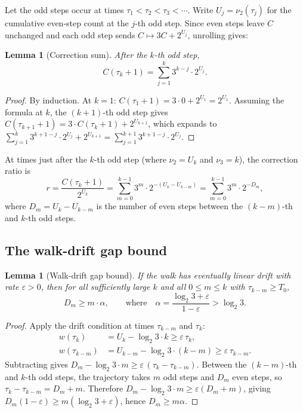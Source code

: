 \documentclass[manuscript]{aomart}
\theoremstyle{plain}
\newtheorem{lemma}[theorem]{Lemma}
\theoremstyle{definition}
\theoremstyle{remark}
\numberwithin{equation}{section}
\begin{document}
Let the odd steps occur at times $\tau_1 < \tau_2 < \tau_3 < \cdots$.
Write $U_j = \nu_2(\tau_j)$ for the cumulative even-step count at the
$j$-th odd step.  Since even steps leave $C$ unchanged and each odd
step sends $C \mapsto 3C + 2^{U_j}$, unrolling gives:

\begin{lemma}[Correction sum]\label{lem:C-sum}
After the $k$-th odd step,
\begin{equation}\label{eq:C-sum}
  C(\tau_k + 1) = \sum_{j=1}^{k} 3^{k-j} \cdot 2^{U_j}.
\end{equation}
\end{lemma}

\begin{proof}
By induction.  At $k = 1$: $C(\tau_1 + 1) = 3 \cdot 0 + 2^{U_1} =
2^{U_1}$.  Assuming the formula at $k$, the $(k{+}1)$-th odd step
gives $C(\tau_{k+1} + 1) = 3 \cdot C(\tau_k + 1) + 2^{U_{k+1}}$,
which expands to
$\sum_{j=1}^{k} 3^{k+1-j} \cdot 2^{U_j} + 2^{U_{k+1}}
= \sum_{j=1}^{k+1} 3^{k+1-j} \cdot 2^{U_j}$.
\end{proof}

At times just after the $k$-th odd step (where $\nu_2 = U_k$ and
$\nu_3 = k$), the correction ratio is
\begin{equation}\label{eq:r-sum}
  r = \frac{C(\tau_k + 1)}{2^{U_k}}
  = \sum_{m=0}^{k-1} 3^m \cdot 2^{-(U_k - U_{k-m})}
  = \sum_{m=0}^{k-1} 3^m \cdot 2^{-D_m},
\end{equation}
where $D_m = U_k - U_{k-m}$ is the number of even steps between the
$(k{-}m)$-th and $k$-th odd steps.

\subsection{The walk-drift gap bound}

\begin{lemma}[Walk-drift gap bound]\label{lem:D-bound}
If the walk has eventually linear drift with rate $\varepsilon > 0$,
then for all sufficiently large $k$ and all $0 \le m \le k$ with
$\tau_{k-m} \ge T_0$,
\begin{equation}\label{eq:D-bound}
  D_m \ge m \cdot \alpha,
  \qquad\text{where}\quad
  \alpha = \frac{\log_2 3 + \varepsilon}{1 - \varepsilon} > \log_2 3.
\end{equation}
\end{lemma}

\begin{proof}
Apply the drift condition at times $\tau_{k-m}$ and $\tau_k$:
\begin{align*}
  w(\tau_k) &= U_k - \log_2 3 \cdot k \ge \varepsilon\,\tau_k,\\
  w(\tau_{k-m}) &= U_{k-m} - \log_2 3 \cdot (k{-}m) \ge \varepsilon\,\tau_{k-m}.
\end{align*}
Subtracting gives
$D_m - \log_2 3 \cdot m \ge \varepsilon\,(\tau_k - \tau_{k-m})$.
Between the $(k{-}m)$-th and $k$-th odd steps, the trajectory takes
$m$ odd steps and $D_m$ even steps, so
$\tau_k - \tau_{k-m} = D_m + m$.  Therefore
$D_m - \log_2 3 \cdot m \ge \varepsilon(D_m + m)$,
giving $D_m(1-\varepsilon) \ge m(\log_2 3 + \varepsilon)$, hence
$D_m \ge m\alpha$.
\end{proof}
\end{document}
